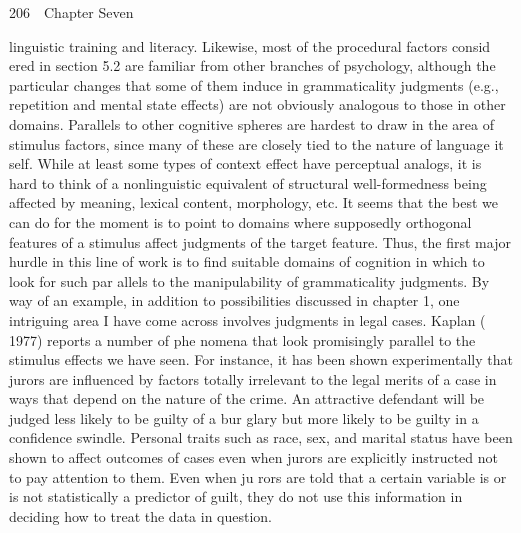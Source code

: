 \clearpage\setcounter{page}{1}\begin{styleStandard}
206\ \ Chapter Seven
\end{styleStandard}


\begin{styleStandard}
linguistic training and literacy. Likewise, most of the procedural factors consid\- ered in section 5.2 are familiar from other branches of psychology, although the particular changes that some of them induce in grammaticality judgments (e.g., repetition and mental state effects) are not obviously analogous to those in other domains. Parallels to other cognitive spheres are hardest to draw in the area of stimulus factors, since many of these are closely tied to the nature of language it\- self. While at least some types of context effect have perceptual analogs, it is hard to think of a nonlinguistic equivalent of structural well-formedness being affected by meaning, lexical content, morphology, etc. It seems that the best we can do for the moment is to point to domains where supposedly orthogonal features of a stimulus affect judgments of the target feature. Thus, the first major hurdle in this line of work is to find suitable domains of cognition in which to look for such par\- allels to the manipulability of grammaticality judgments. By way of an example, in addition to possibilities discussed in chapter 1, one intriguing area I have come across involves judgments in legal cases. Kaplan ( 1977) reports a number of phe\- nomena that look promisingly parallel to the stimulus effects we have seen. For instance, it has been shown experimentally that jurors are influenced by factors totally irrelevant to the legal merits of a case in ways that depend on the nature of the crime. An attractive defendant will be judged less likely to be guilty of a bur\- glary but more likely to be guilty in a confidence swindle. Personal traits such as race, sex, and marital status have been shown to affect outcomes of cases even when jurors are explicitly instructed not to pay attention to them. Even when ju\- rors are told that a certain variable is or is not statistically a predictor of guilt, they do not use this information in deciding how to treat the data in question.
\end{styleStandard}


